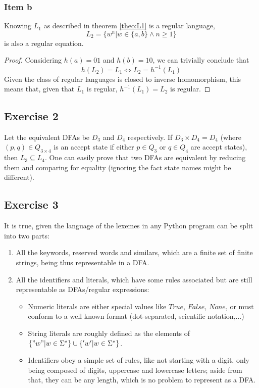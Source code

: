 \documentclass[docid=CA06]{tcom_CA}
\begin{document}
{\subsubsection{Item b}
\begin{theorem}
	Knowing $L_1$ as described in theorem \ref{theo:L1} is a regular language,
	\begin{equation*}
		L_2 = \{w^n | w \in \{a,b\} \wedge n \geq 1 \}
	\end{equation*}
	is also a regular equation.
\end{theorem}
\begin{proof}
Considering $h(a)=01$ and $h(b)=10$, we can trivially conclude that
\begin{equation*}
	h(L_2)=L_1 \iff L_2 = h^{-1}(L_1)
\end{equation*}
Given the class of regular languages is closed to inverse homomorphism, this means that, given that $L_1$ is regular, $h^{-1}(L_1)=L_2$ is regular.
\end{proof}
}
\subsection{Exercise 2}
Let the equivalent DFAs be $D_3$ and $D_4$ respectively. If $D_3 \times D_4=D_4$ (where $(p,q)\in Q_{3 \times 4}$ is an accept state if either $p \in Q_3$ or $q \in Q_4$ are accept states), then $L_3 \subseteq L_4$. One can easily prove that two DFAs are equivalent by reducing them and comparing for equality (ignoring the fact state names might be different).
\subsection{Exercise 3}
It is true, given the language of the lexemes in any Python program can be split into two parts:
\begin{enumerate}
	\item All the keywords, reserved words and similars, which are a finite set of finite strings, being thus representable in a DFA.
	\item All the identifiers and literals, which have some rules associated but are still representable as DFAs/regular expressions:
	\begin{itemize}
		\item Numeric literals are either special values like $True$, $False$, $None$, or must conform to a well known format (dot-separated, scientific notation,...)
		\item String literals are roughly defined as the elements of $\{"w" | w \in \Sigma^* \} \cup \{'w' | w \in \Sigma^* \}$.
		\item Identifiers obey a simple set of rules, like not starting with a digit, only being composed of digits, uppercase and lowercase letters; aside from that, they can be any length, which is no problem to represent as a DFA.
	\end{itemize}
\end{enumerate}
\end{document}

